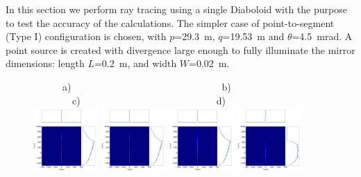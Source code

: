 \documentclass{iucr}              %
\begin{document}
In this section we perform ray tracing using a single Diaboloid with the purpose to test the accuracy of the calculations. The simpler case of point-to-segment (Type I) configuration is chosen, with $p$=29.3~m, $q$=19.53~m and $\theta$=4.5~mrad. A point source is created with divergence large enough to fully illuminate the mirror dimensions: 
length $L$=0.2~m, and width $W$=0.02~m.

\begin{figure}[h]
\flushleft
~~~~~~a)~~~~~~~~~~~~~~~~~~~~~~~~~~~~~~~b)~~~~~~~~~~~~~~~~~~~~~~~~~~~c)~~~~~~~~~~~~~~~~~~~~~~~~~~~~d)\\
\centering
\includegraphics[width=0.22\textwidth]{figures/p2s_V.png}
\includegraphics[width=0.22\textwidth]{figures/p2s_K.png}
\includegraphics[width=0.22\textwidth]{figures/p2s_parabolic-cone.png}
\includegraphics[width=0.22\textwidth]{figures/p2s_toroid.png}


\end{figure}
\end{document}
